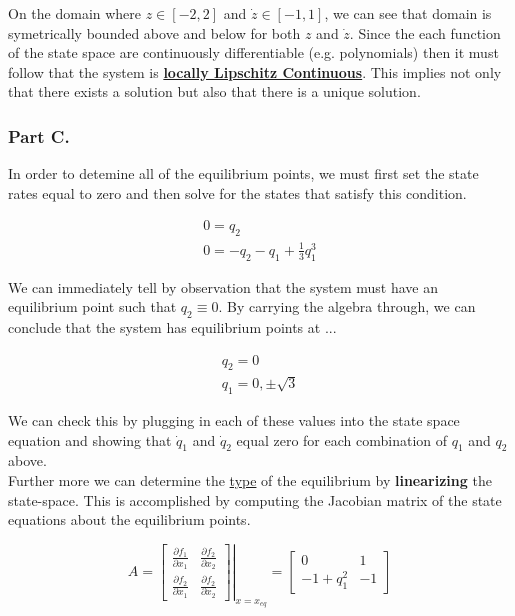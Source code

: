 \noindent On the domain where $z \in[-2,2]$ and $\dot{z} \in[-1,1]$, we can see that domain is symetrically bounded above and below for both $z$ and $\dot{z}$. Since the each function of the state space are continuously differentiable (e.g. polynomials) then it must follow that the system is \underline{\textbf{locally Lipschitz Continuous}}. This implies not only that there exists a solution but also that there is a unique solution. 


\subsubsection*{\textbf{Part C.}}

In order to detemine all of the equilibrium points, we must first set the state rates equal to zero and then solve for the states that satisfy this condition.


$$
\begin{array}{l}
0=q_{2} \\
0=-q_{2}-q_{1}+\frac{1}{3} q_{1}^{3}
\end{array}
$$

\noindent We can immediately tell by observation that the system must have an equilibrium point such that $q_2 \equiv 0$. By carrying the algebra through, we can conclude that the system has equilibrium points at ...

$$
\begin{array}{l}
q_{2}=0 \\
q_{1}=0, \pm \sqrt{3}
\end{array}
$$

\noindent We can check this by plugging in each of these values into the state space equation and showing that $\dot{q}_1$ and $\dot{q}_2$ equal zero for each combination of $q_1$ and $q_2$ above. \\

\noindent Further more we can determine the \underline{type} of the equilibrium by \textbf{linearizing} the state-space. This is accomplished by computing the Jacobian matrix of the state equations about the equilibrium points.


$$
A=\left.\left[\begin{array}{ll}
\frac{\partial f_{1}}{\partial x_{1}} & \frac{\partial f_{2}}{\partial x_{2}} \\
\frac{\partial f_{2}}{\partial x_{1}} & \frac{\partial f_{2}}{\partial x_{2}}
\end{array}\right]\right|_{x=x_{e q}}
= \left[\begin{array}{cc}
0 & 1 \\
-1+q_{1}^{2} & -1
\end{array}\right]
$$

